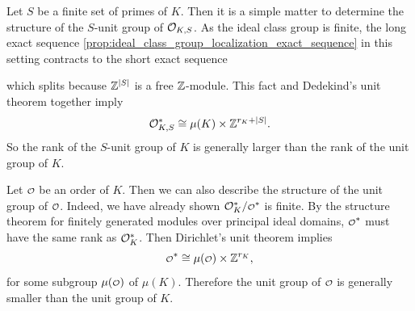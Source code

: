     Let \(S\) be a finite set of primes of \(K\). Then it is a simple matter to determine the structure of the \(S\)-unit group of \(\mathcal{O}_{K,S}\). As the ideal class group is finite, the long exact sequence \cref{prop:ideal_class_group_localization_exact_sequence} in this setting contracts to the short exact sequence
    \begin{center}
    \end{center}
    which splits because \(\mathbb{Z}^{|S|}\) is a free \(\mathbb{Z}\)-module. This fact and Dedekind's unit theorem together imply
    \[
      \mathcal{O}_{K,S}^{\ast} \cong \mu(K) \times \mathbb{Z}^{r_{K}+|S|}.
    \]
    So the rank of the \(S\)-unit group of \(K\) is generally larger than the rank of the unit group of \(K\).

    Let \(\smc{O}\) be an order of \(K\). Then we can also describe the structure of the unit group of \(\smc{O}\). Indeed, we have already shown \(\mc{O}_{K}^{\ast}/\smc{O}^{\ast}\) is finite. By the structure theorem for finitely generated modules over principal ideal domains, \(\smc{O}^{\ast}\) must have the same rank as \(\mathcal{O}_{K}^{\ast}\). Then Dirichlet's unit theorem implies
    \[
      \smc{O}^{\ast} \cong \mu(\smc{O}) \x \Z^{r_{K}},
    \]
    for some subgroup \(\mu(\smc{O})\) of \(\mu(K)\). Therefore the unit group of \(\smc{O}\) is generally smaller than the unit group of \(K\).